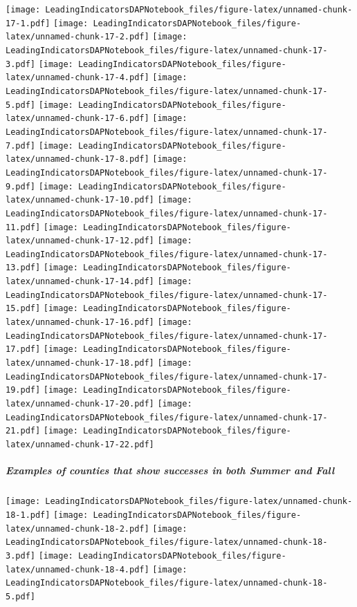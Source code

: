 \documentclass[]{article}
\let\oldsubparagraph\subparagraph
\renewcommand{\subparagraph}[1]{\oldsubparagraph{#1}\mbox{}}
\begin{document}
\texttt{[image: LeadingIndicatorsDAPNotebook\_files/figure-latex/unnamed-chunk-17-1.pdf]}
\texttt{[image: LeadingIndicatorsDAPNotebook\_files/figure-latex/unnamed-chunk-17-2.pdf]}
\texttt{[image: LeadingIndicatorsDAPNotebook\_files/figure-latex/unnamed-chunk-17-3.pdf]}
\texttt{[image: LeadingIndicatorsDAPNotebook\_files/figure-latex/unnamed-chunk-17-4.pdf]}
\texttt{[image: LeadingIndicatorsDAPNotebook\_files/figure-latex/unnamed-chunk-17-5.pdf]}
\texttt{[image: LeadingIndicatorsDAPNotebook\_files/figure-latex/unnamed-chunk-17-6.pdf]}
\texttt{[image: LeadingIndicatorsDAPNotebook\_files/figure-latex/unnamed-chunk-17-7.pdf]}
\texttt{[image: LeadingIndicatorsDAPNotebook\_files/figure-latex/unnamed-chunk-17-8.pdf]}
\texttt{[image: LeadingIndicatorsDAPNotebook\_files/figure-latex/unnamed-chunk-17-9.pdf]}
\texttt{[image: LeadingIndicatorsDAPNotebook\_files/figure-latex/unnamed-chunk-17-10.pdf]}
\texttt{[image: LeadingIndicatorsDAPNotebook\_files/figure-latex/unnamed-chunk-17-11.pdf]}
\texttt{[image: LeadingIndicatorsDAPNotebook\_files/figure-latex/unnamed-chunk-17-12.pdf]}
\texttt{[image: LeadingIndicatorsDAPNotebook\_files/figure-latex/unnamed-chunk-17-13.pdf]}
\texttt{[image: LeadingIndicatorsDAPNotebook\_files/figure-latex/unnamed-chunk-17-14.pdf]}
\texttt{[image: LeadingIndicatorsDAPNotebook\_files/figure-latex/unnamed-chunk-17-15.pdf]}
\texttt{[image: LeadingIndicatorsDAPNotebook\_files/figure-latex/unnamed-chunk-17-16.pdf]}
\texttt{[image: LeadingIndicatorsDAPNotebook\_files/figure-latex/unnamed-chunk-17-17.pdf]}
\texttt{[image: LeadingIndicatorsDAPNotebook\_files/figure-latex/unnamed-chunk-17-18.pdf]}
\texttt{[image: LeadingIndicatorsDAPNotebook\_files/figure-latex/unnamed-chunk-17-19.pdf]}
\texttt{[image: LeadingIndicatorsDAPNotebook\_files/figure-latex/unnamed-chunk-17-20.pdf]}
\texttt{[image: LeadingIndicatorsDAPNotebook\_files/figure-latex/unnamed-chunk-17-21.pdf]}
\texttt{[image: LeadingIndicatorsDAPNotebook\_files/figure-latex/unnamed-chunk-17-22.pdf]}

\hypertarget{examples-of-counties-that-show-successes-in-both-summer-and-fall-1}{%
\subparagraph{Examples of counties that show successes in both Summer
and
Fall}\label{examples-of-counties-that-show-successes-in-both-summer-and-fall-1}}

\texttt{[image: LeadingIndicatorsDAPNotebook\_files/figure-latex/unnamed-chunk-18-1.pdf]}
\texttt{[image: LeadingIndicatorsDAPNotebook\_files/figure-latex/unnamed-chunk-18-2.pdf]}
\texttt{[image: LeadingIndicatorsDAPNotebook\_files/figure-latex/unnamed-chunk-18-3.pdf]}
\texttt{[image: LeadingIndicatorsDAPNotebook\_files/figure-latex/unnamed-chunk-18-4.pdf]}
\texttt{[image: LeadingIndicatorsDAPNotebook\_files/figure-latex/unnamed-chunk-18-5.pdf]}
\end{document}
